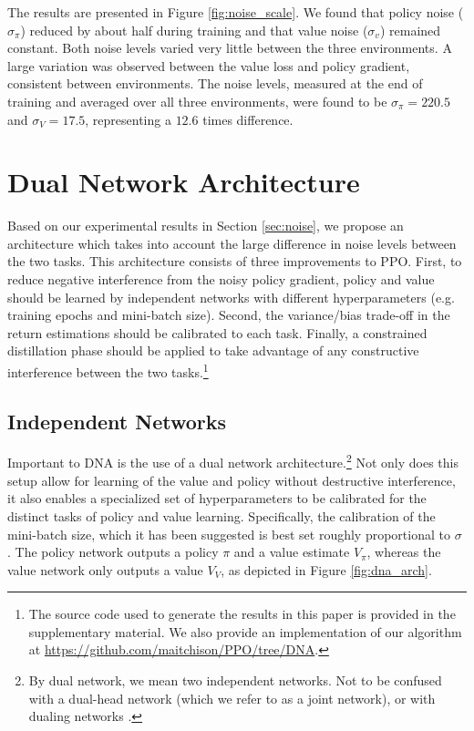 \documentclass{article}
\begin{document}
The results are presented in Figure \ref{fig:noise_scale}. We found that policy noise ($\sigma_\pi$) reduced by about half during training and that value noise ($\sigma_v$) remained constant. Both noise levels varied very little between the three environments. A large variation was observed between the value loss and policy gradient, consistent between environments. The noise levels, measured at the end of training and averaged over all three environments, were found to be $\sigma_\pi=220.5$ and $\sigma_V=17.5$, representing a $12.6$ times difference.

\section{Dual Network Architecture}
\label{sec:dna}

Based on our experimental results in Section \ref{sec:noise}, we propose an architecture which takes into account the large difference in noise levels between the two tasks. This architecture consists of three improvements to PPO. First, to reduce negative interference from the noisy policy gradient, policy and value should be learned by independent networks with different hyperparameters (e.g. training epochs and mini-batch size). Second, the variance/bias trade-off in the return estimations should be calibrated to each task. Finally, a constrained distillation phase should be applied to take advantage of any constructive interference between the two tasks.\footnote{The source code used to generate the results in this paper is provided in the supplementary material. We also provide an implementation of our algorithm at \url{https://github.com/maitchison/PPO/tree/DNA}.}

\subsection{Independent Networks}






Important to DNA is the use of a dual network architecture.\footnote{By dual network, we mean two independent networks. Not to be confused with a dual-head network (which we refer to as a joint network), or with dualing networks \cite{wang2016dueling}.} Not only does this setup allow for learning of the value and policy without destructive interference, it also enables a specialized set of hyperparameters to be calibrated for the distinct tasks of policy and value learning. Specifically, the calibration of the mini-batch size, which it has been suggested is best set roughly proportional to $\sigma$ \cite{mccandlish2018empirical}. The policy network outputs a policy $\pi$ and a value estimate $V_\pi$, whereas the value network only outputs a value $V_V$, as depicted in Figure \ref{fig:dna_arch}.
\end{document}
